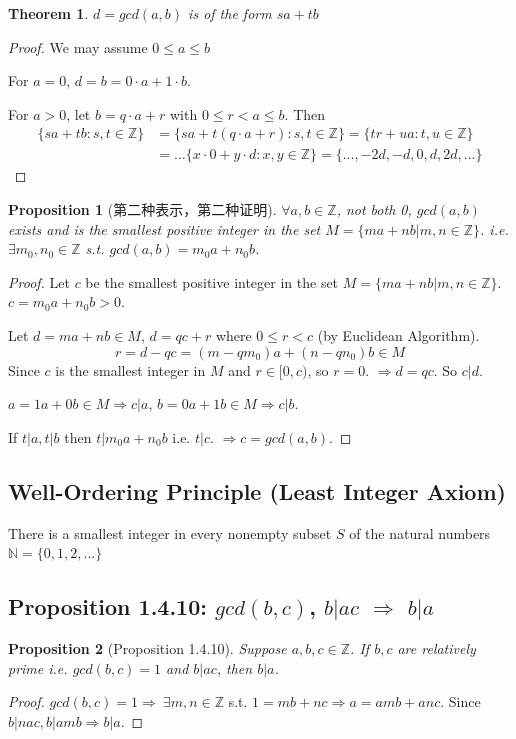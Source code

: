 \documentclass[11pt,a4paper]{article}
\newtheorem{theorem}{Theorem}
\newtheorem{proposition}{Proposition}
\begin{document}
\begin{theorem}
    $d = gcd(a, b)$ is of the form $sa + tb$
\end{theorem}
\begin{proof}

We may assume $0\leq a\leq b$

For $a=0$, $d=b=0\cdot a+1\cdot b$.

For $a>0$, let $b=q\cdot a+r$ with $0\leq r<a\leq b$. Then
\begin{equation}
    \begin{aligned}
        \{sa+tb:s,t\in \mathbb{Z}\}&=\{sa+t(q\cdot a+r):s,t\in \mathbb{Z}\}=\{tr+ua: t,u\in \mathbb{Z}\}\\
        &=\dots \{x\cdot 0+y\cdot d: x,y\in \mathbb{Z}\}=\{...,-2d,-d,0,d,2d,...\}
    \end{aligned}
    \nonumber
\end{equation}
\end{proof}

\begin{proposition}[第二种表示，第二种证明]
    $\forall a,b\in\mathbb{Z}$, not both 0, $gcd(a,b)$ exists and is the smallest positive integer in the set $M=\{ma+nb|m,n\in\mathbb{Z}\}$. i.e. $\exists m_0,n_0\in\mathbb{Z}$ s.t. $gcd(a,b)=m_0a+n_0b$.
\end{proposition}

\begin{proof}

Let $c$ be the smallest positive integer in the set $M=\{ma+nb|m,n\in\mathbb{Z}\}$. $c=m_0 a+n_0 b>0$.

Let $d=ma+nb\in M$, $d=qc+r$ where $0\leq r<c$ (by Euclidean Algorithm).
$$r=d-qc=(m-qm_0)a+(n-qn_0)b\in M$$
Since $c$ is the smallest integer in $M$ and $r\in[0,c)$, so $r=0$. $\Rightarrow d=qc$. So $c|d$.

$a=1a+0b\in M\Rightarrow c|a$, $b=0a+1b\in M\Rightarrow c|b$.

If $t|a,t|b$ then $t|m_0 a+n_0 b \text{ i.e. } t|c$. $\Rightarrow c=gcd(a,b)$.
\end{proof}

\subsection{Well-Ordering Principle (Least Integer Axiom)}
There is a smallest integer in every nonempty subset $S$ of the natural numbers $\mathbb{N}=\{0,1,2,...\}$

\subsection{Proposition 1.4.10: $gcd(b,c)$, $b|ac$ $\Rightarrow$ $b|a$}
\begin{proposition}[Proposition 1.4.10]
    Suppose $a,b,c\in\mathbb{Z}$. If $b,c$ are \textit{relatively prime} i.e. $gcd(b,c)=1$ and $b|ac$, then $b|a$.
\end{proposition}
\begin{proof}
$gcd(b,c)=1\Rightarrow\ \exists m,n\in\mathbb{Z}$ s.t. $1=mb+nc \Rightarrow a=amb+anc$. Since $b|nac, b|amb\Rightarrow b|a$.
\end{proof}
\end{document}
